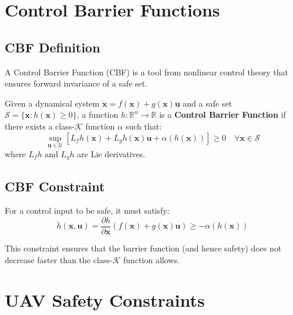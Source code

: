 \section{Control Barrier Functions}

\subsection{CBF Definition}

A Control Barrier Function (CBF) is a tool from nonlinear control theory that ensures forward invariance of a safe set.

\begin{definition}
Given a dynamical system $\dot{\mathbf{x}} = f(\mathbf{x}) + g(\mathbf{x})\mathbf{u}$ and a safe set $\mathcal{S} = \{\mathbf{x} : h(\mathbf{x}) \geq 0\}$, a function $h: \mathbb{R}^n \to \mathbb{R}$ is a \textbf{Control Barrier Function} if there exists a class-$\mathcal{K}$ function $\alpha$ such that:
\begin{equation}
    \sup_{\mathbf{u} \in \mathcal{U}} \left[ L_f h(\mathbf{x}) + L_g h(\mathbf{x}) \mathbf{u} + \alpha(h(\mathbf{x})) \right] \geq 0 \quad \forall \mathbf{x} \in \mathcal{S}
\end{equation}
where $L_f h$ and $L_g h$ are Lie derivatives.
\end{definition}


\subsection{CBF Constraint}

For a control input to be safe, it must satisfy:
\begin{equation}
    \dot{h}(\mathbf{x}, \mathbf{u}) = \frac{\partial h}{\partial \mathbf{x}} \left( f(\mathbf{x}) + g(\mathbf{x})\mathbf{u} \right) \geq -\alpha(h(\mathbf{x}))
\end{equation}

This constraint ensures that the barrier function (and hence safety) does not decrease faster than the class-$\mathcal{K}$ function allows.

\section{UAV Safety Constraints}

